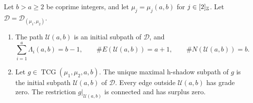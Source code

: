 \begin{lemma}\label{lem:frame-shadow-position}
Let $b>a\ge2$ be coprime integers, and let $\mu_j=\mu_j(a,b)$ for $j\in[2]_{\mathbb Z}$.
Let $\mathcal D=\mathcal D_{(\mu_1,\mu_2)}$.

\begin{enumerate}
\item\label{c:frame-initial-path} The path $\mathcal U(a,b)$ is an initial subpath of $\mathcal D$, and
\[
 \sum_{i=1}^{a}\Lambda_i(a,b)=b-1,\qquad
 \#E(\mathcal U(a,b))=a+1,\qquad \#N(\mathcal U(a,b))=b.
\]
\item\label{c:frame-unique-shadow} Let $g\in\operatorname{TCG}(\mu_1,\mu_2,a,b)$.
The unique maximal h-shadow subpath of $g$ is the initial subpath $\mathcal U(a,b)$ of $\mathcal D$.
Every edge outside $\mathcal U(a,b)$ has grade zero.
The restriction $g|_{\mathcal U(a,b)}$ is connected and has surplus zero.
\end{enumerate}
\end{lemma}
